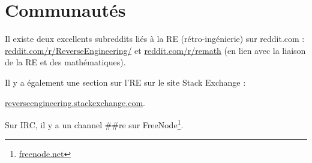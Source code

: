 \chapter{Communautés}

Il existe deux excellents subreddits liés à la \ac{RE} (rétro-ingénierie) sur reddit.com :\\
\href{http://go.yurichev.com/17027}{reddit.com/r/ReverseEngineering/} et
\href{http://go.yurichev.com/17028}{reddit.com/r/remath}
(en lien avec la liaison de la \ac{RE} et des mathématiques).

Il y a également une section sur l'\ac{RE} sur le site Stack Exchange :

\par \href{http://go.yurichev.com/17029}{reverseengineering.stackexchange.com}.

Sur IRC, il y a un channel \#\#re sur
FreeNode\footnote{\href{http://go.yurichev.com/17030}{freenode.net}}.

